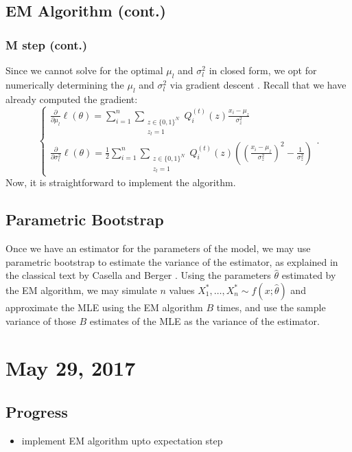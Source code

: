 \documentclass{article}
\begin{document}
\subsection{EM Algorithm (cont.)}
\subsubsection{M step (cont.)}
Since we cannot solve for the optimal $\mu_l$ and $\sigma_l^2$ in closed form, we opt for numerically determining the $\mu_l$ and $\sigma_l^2$ via gradient descent \cite{bishop2006pattern}. Recall that we have already computed the gradient:
\[
  \begin{cases}
    \frac{\partial}{\partial\mu_l}\ell(\theta) = \sum_{i=1}^n\sum_{\substack{z\in\{0,1\}^N \\ z_l = 1}} Q_i^{(t)}(z)\frac{x_i-\mu_z}{\sigma_z^2} \\
    \frac{\partial}{\partial\sigma_l^2}\ell(\theta) = \frac12\sum_{i=1}^n\sum_{\substack{z\in\{0,1\}^N \\ z_l = 1}} Q_i^{(t)}(z)\left(\left(\frac{x_i-\mu_z}{\sigma_z^2}\right)^2-\frac1{\sigma_z^2}\right)
  \end{cases}.
\]
Now, it is straightforward to implement the algorithm.

\subsection{Parametric Bootstrap}
Once we have an estimator for the parameters of the model, we may use parametric bootstrap to estimate the variance of the estimator, as explained in the classical text by Casella and Berger \cite{casella2002statistical}. Using the parameters $\hat\theta$ estimated by the EM algorithm, we may simulate $n$ values $X_1^*, \dots, X_n^*\sim f(x;\hat\theta)$ and approximate the MLE using the EM algorithm $B$ times, and use the sample variance of those $B$ estimates of the MLE as the variance of the estimator.

\section{May 29, 2017}
\subsection{Progress}
\begin{itemize}
  \item implement EM algorithm upto expectation step
\end{itemize}
\end{document}
